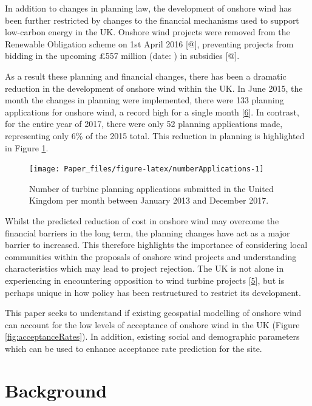 \documentclass[a4paper,]{article}
\theoremstyle{definition}
\theoremstyle{definition}
\theoremstyle{definition}
\theoremstyle{remark}
\begin{document}
In addition to changes in planning law, the development of onshore wind
has been further restricted by changes to the financial mechanisms used
to support low-carbon energy in the UK. Onshore wind projects were
removed from the Renewable Obligation scheme on 1st April 2016 {[}@{]},
preventing projects from bidding in the upcoming £557 million (date: )
in subsidies {[}@{]}.

As a result these planning and financial changes, there has been a
dramatic reduction in the development of onshore wind within the UK. In
June 2015, the month the changes in planning were implemented, there
were 133 planning applications for onshore wind, a record high for a
single month {[}\protect\hyperlink{ref-DECC2016}{6}{]}. In contrast, for
the entire year of 2017, there were only 52 planning applications made,
representing only 6\% of the 2015 total. This reduction in planning is
highlighted in Figure \ref{fig:numberApplications}.





\begin{figure}[h]

{\centering \texttt{[image: Paper\_files/figure-latex/numberApplications-1]} 

}

\caption{Number of turbine planning applications
submitted in the United Kingdom per month between January 2013 and
December 2017.}\label{fig:numberApplications}
\end{figure}

Whilst the predicted reduction of cost in onshore wind may overcome the
financial barriers in the long term, the planning changes have act as a
major barrier to increased. This therefore highlights the importance of
considering local communities within the proposals of onshore wind
projects and understanding characteristics which may lead to project
rejection. The UK is not alone in experiencing in encountering
opposition to wind turbine projects
{[}\protect\hyperlink{ref-Langer2016}{5}{]}, but is perhaps unique in
how policy has been restructured to restrict its development.

This paper seeks to understand if existing geospatial modelling of
onshore wind can account for the low levels of acceptance of onshore
wind in the UK (Figure \ref{fig:acceptanceRates}). In addition, existing
social and demographic parameters which can be used to enhance
acceptance rate prediction for the site.

\section{Background}\label{background}
\end{document}
